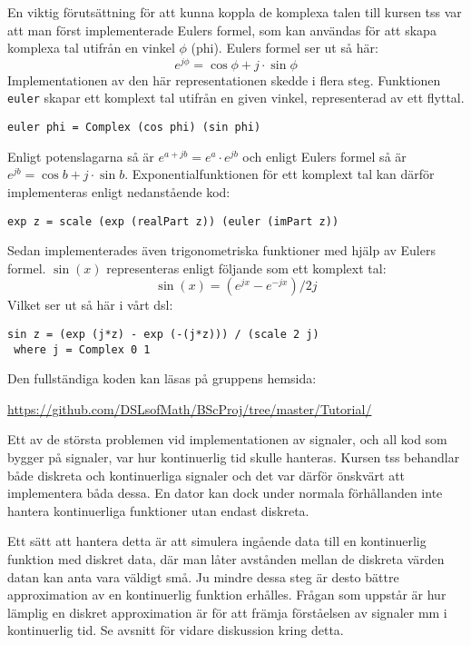 \documentclass[12pt,a4paper,twoside,openright]{article}
\begin{document}
En viktig förutsättning för att kunna koppla de komplexa talen till
kursen \gls{tss} var att man först implementerade Eulers formel, som
kan användas för att skapa komplexa tal utifrån en vinkel \(\phi\)
(phi). Eulers formel ser ut så här:
\[e^{j\phi}=\cos \phi+ j \cdot \sin \phi \]
Implementationen av den här representationen skedde i flera steg.
Funktionen \texttt{euler} skapar ett komplext tal utifrån
en given vinkel, representerad av ett flyttal.
\begin{verbatim}
euler phi = Complex (cos phi) (sin phi)
\end{verbatim}
Enligt potenslagarna så är \(e^{a+jb} = e^{a} \cdot e^{jb}\) och
enligt Eulers formel så är \(e^{j b} = \cos b + j\cdot \sin b\).
Exponentialfunktionen för ett komplext tal kan därför implementeras
enligt nedanstående kod:
\begin{verbatim}
exp z = scale (exp (realPart z)) (euler (imPart z))
\end{verbatim}
Sedan implementerades även trigonometriska funktioner med hjälp av
Eulers formel. \(\sin(x)\) representeras enligt följande som ett komplext
tal:
\[ \sin(x) = (e^{j x} - e^{-j x}) / 2 j \]
Vilket ser ut så här i vårt \gls{dsl}:
\begin{verbatim}
sin z = (exp (j*z) - exp (-(j*z))) / (scale 2 j)
 where j = Complex 0 1
\end{verbatim}

Den fullständiga koden kan läsas på gruppens hemsida:

\url{https://github.com/DSLsofMath/BScProj/tree/master/Tutorial/}

Ett av de största problemen vid implementationen av signaler, och all
kod som bygger på signaler, var hur kontinuerlig tid skulle
hanteras. Kursen \gls{tss} behandlar både diskreta och kontinuerliga
signaler och det var därför önskvärt att implementera båda dessa. En
dator kan dock under normala förhållanden inte hantera kontinuerliga
funktioner utan endast diskreta.

Ett sätt att hantera detta är att simulera ingående data till en
kontinuerlig funktion med diskret data, där man låter avstånden mellan
de diskreta värden datan kan anta vara väldigt små. Ju mindre dessa
steg är desto bättre approximation av en kontinuerlig funktion
erhålles. Frågan som uppstår är hur lämplig en diskret approximation
är för att främja förståelsen av signaler mm i kontinuerlig tid. Se
avsnitt  för vidare diskussion kring detta.
\end{document}
